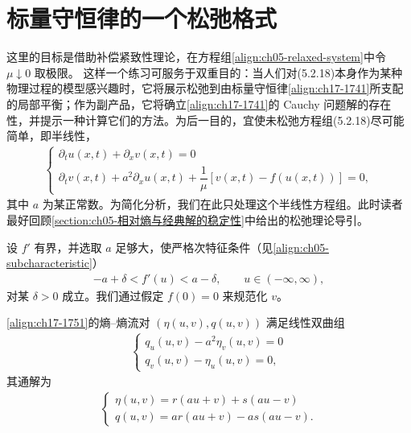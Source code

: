 \documentclass[../../main.tex]{subfiles}
\begin{document}
\section{标量守恒律的一个松弛格式}\label{section:ch17-标量松弛格式}

这里的目标是借助补偿紧致性理论，在方程组\eqref{align:ch05-relaxed-system}中令 $\mu\downarrow0$ 取极限。
这样一个练习可服务于双重目的：当人们对(5.2.18)本身作为某种物理过程的模型感兴趣时，它将展示松弛到由标量守恒律\eqref{align:ch17-1741}所支配的局部平衡；作为副产品，它将确立\eqref{align:ch17-1741}的 Cauchy 问题解的存在性，并提示一种计算它们的方法。为后一目的，宜使未松弛方程组(5.2.18)尽可能简单，即半线性，
\begin{align}
\begin{cases}
\partial_t u(x,t)+\partial_x v(x,t)=0\\
\partial_t v(x,t)+a^2\partial_x u(x,t)+\dfrac{1}{\mu}[v(x,t)-f(u(x,t))]=0,
\end{cases}
\label{align:ch17-1751}
\end{align}
其中 $a$ 为某正常数。为简化分析，我们在此只处理这个半线性方程组。此时读者最好回顾\cref{section:ch05-相对熵与经典解的稳定性}中给出的松弛理论导引。

设 $f'$ 有界，并选取 $a$ 足够大，使严格次特征条件（见\eqref{align:ch05-subcharacteristic}）
\begin{align}
-a+\delta<f'(u)<a-\delta,\qquad u\in(-\infty,\infty),
\label{align:ch17-1752}
\end{align}
对某 $\delta>0$ 成立。我们通过假定 $f(0)=0$ 来规范化 $v$。

\eqref{align:ch17-1751}的熵--熵流对 $(\eta(u,v),q(u,v))$ 满足线性双曲组
\begin{align}
\begin{cases}
q_u(u,v)-a^2\eta_v(u,v)=0\\
q_v(u,v)-\eta_u(u,v)=0,
\end{cases}
\label{align:ch17-1753}
\end{align}
其通解为
\begin{align}
\begin{cases}
\eta(u,v)=r(au+v)+s(au-v)\\
q(u,v)=ar(au+v)-as(au-v).
\end{cases}
\label{align:ch17-1754}
\end{align}
\end{document}
